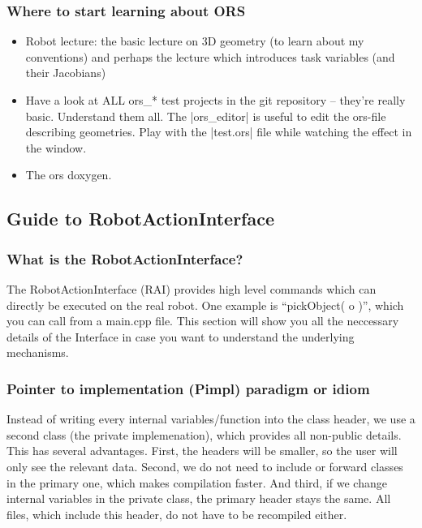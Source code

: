 \subsubsection{Where to start learning about ORS}

\begin{itemize}
\item Robot lecture: the basic lecture on 3D geometry (to learn about my
conventions) and perhaps the lecture which introduces task variables
(and their Jacobians)

\item Have a look at ALL ors\_* test projects in the git repository --
they're really basic. Understand them all. The |ors\_editor| is useful to
edit the ors-file describing geometries. Play with the |test.ors| file
while watching the effect in the window.

\item The ors doxygen.
\end{itemize}



\subsection{Guide to RobotActionInterface}
\subsubsection{What is the RobotActionInterface?}
The RobotActionInterface (RAI) provides high level commands which can directly
be executed on the real robot. One example is ``pickObject( o )'', which you can
call from a main.cpp file. This section will show you all the neccessary details
of the Interface in case you want to understand the underlying mechanisms.
\subsubsection{Pointer to implementation (Pimpl) paradigm or idiom}
Instead of writing every internal variables/function into the class
header, we use a second class (the private implemenation), which provides
all non-public details. This has several advantages. First, the
headers will be smaller, so the user will only see the relevant data. Second, we do
not need to include or forward classes in the primary one, which makes
compilation faster. And third, if we change internal variables in the private
class, the primary header stays the same. All files, which include this header,
do not have to be recompiled either.

